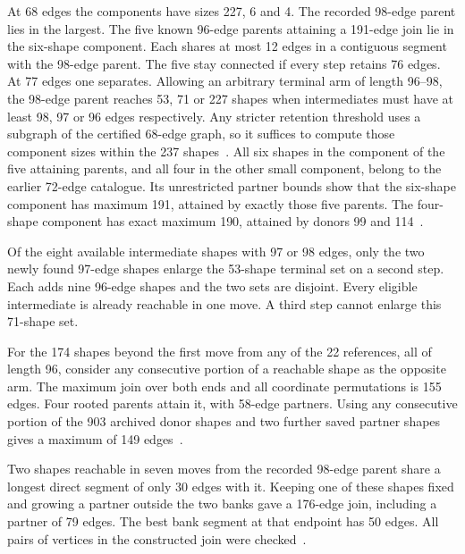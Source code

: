 \documentclass[11pt,a4paper]{article}
\theoremstyle{definition}
\theoremstyle{remark}
\begin{document}
At 68 edges the components have sizes 227, 6 and 4. The recorded
98-edge parent lies in the largest. The five known 96-edge parents
attaining a 191-edge join lie in the six-shape component. Each shares
at most 12 edges in a contiguous segment with the 98-edge parent.
The five stay connected if every step retains 76 edges. At 77 edges
one separates. Allowing an arbitrary terminal arm of length 96--98,
the 98-edge parent reaches 53, 71 or 227 shapes when intermediates
must have at least 98, 97 or 96 edges respectively. Any stricter
retention threshold uses a subgraph of the certified 68-edge graph,
so it suffices to compute those component sizes within the 237
shapes~\cite{repeat253}.
All six shapes in the component of the five attaining parents, and
all four in the other small component, belong to the earlier 72-edge
catalogue. Its unrestricted partner bounds show that the six-shape
component has maximum 191, attained by exactly those five parents.
The four-shape component has exact maximum 190, attained by
donors 99 and 114~\cite{segment251,repeat253}.


Of the eight available intermediate shapes with 97 or 98 edges,
only the two newly found 97-edge shapes enlarge the 53-shape
terminal set on a second step. Each adds nine 96-edge shapes and
the two sets are disjoint. Every eligible intermediate is already
reachable in one move. A third step cannot enlarge this
71-shape set.

For the 174 shapes beyond the first move from any of the 22 references,
all of length 96, consider any consecutive portion of a reachable
shape as the opposite arm. The maximum join over both ends and all
coordinate permutations is 155 edges. Four rooted parents attain
it, with 58-edge partners. Using any consecutive portion of the
903 archived donor shapes and two further saved partner shapes gives
a maximum of 149 edges~\cite{repeat253}.

Two shapes reachable in seven moves from the recorded 98-edge parent
share a longest direct segment of only 30 edges with it. Keeping
one of these shapes fixed and growing a partner outside the two
banks gave a 176-edge join, including a partner of 79 edges.
The best bank segment at that endpoint has 50 edges. All pairs
of vertices in the constructed join were checked~\cite{repeat253}.
\end{document}
